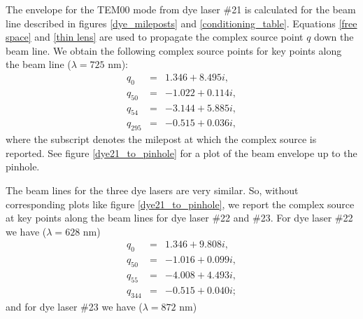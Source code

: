 The envelope for the TEM00 mode from dye laser \#21 is calculated for the beam line described in figures \ref{dye_mileposts} and \ref{conditioning_table}. Equations \ref{free space} and \ref{thin lens} are used to propagate the complex source point $q$ down the beam line. We obtain the following complex source points for key points along the beam line ($\lambda=725$ nm):
\begin{eqnarray}
q_{0}   &=& 1.346  + 8.495i,\\
q_{50}  &=& -1.022 + 0.114i,\\
q_{54}  &=& -3.144 + 5.885i,\\
q_{295} &=& -0.515 + 0.036i,
\end{eqnarray}
where the subscript denotes the milepost at which the complex source is reported. See figure \ref{dye21_to_pinhole} for a plot of the beam envelope up to the pinhole.

The beam lines for the three dye lasers are very similar. So, without corresponding plots like figure \ref{dye21_to_pinhole}, we report the complex source at key points along the beam lines for dye laser \#22 and \#23. For dye laser \#22 we have ($\lambda=628$ nm)
\begin{eqnarray}
q_{0}   &=& 1.346  + 9.808i,\\
q_{50}  &=& -1.016 + 0.099i,\\
q_{55}  &=& -4.008 + 4.493i,\\
q_{344} &=& -0.515 + 0.040i;
\end{eqnarray}
and for dye laser \#23 we have ($\lambda=872$ nm)
